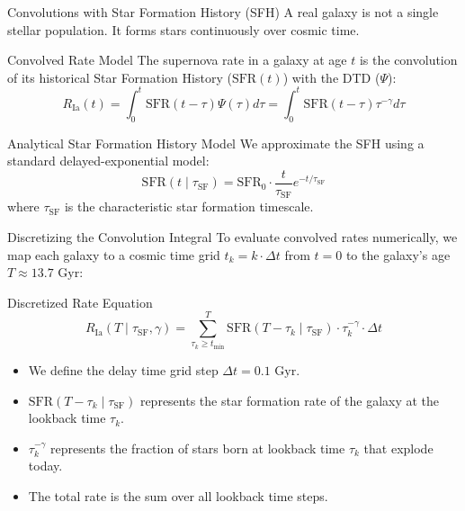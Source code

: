 \documentclass[9pt]{beamer}
\begin{document}
\begin{frame}{Convolutions with Star Formation History (SFH)}
  A real galaxy is not a single stellar population. It forms stars continuously over cosmic time.
  \begin{block}{Convolved Rate Model}
    The supernova rate in a galaxy at age $t$ is the convolution of its historical Star Formation History ($\text{SFR}(t)$) with the DTD ($\Psi$):
    $$R_{\text{Ia}}(t) = \int_0^t \text{SFR}(t - \tau) \Psi(\tau) d\tau = \int_0^t \text{SFR}(t - \tau) \tau^{-\gamma} d\tau$$
  \end{block}
  \begin{block}{Analytical Star Formation History Model}
    We approximate the SFH using a standard delayed-exponential model:
    $$\text{SFR}(t \mid \tau_{\text{SF}}) = \text{SFR}_0 \cdot \frac{t}{\tau_{\text{SF}}} e^{-t/\tau_{\text{SF}}}$$
    where $\tau_{\text{SF}}$ is the characteristic star formation timescale.
  \end{block}
\end{frame}

\begin{frame}{Discretizing the Convolution Integral}
  To evaluate convolved rates numerically, we map each galaxy to a cosmic time grid $t_k = k \cdot \Delta t$ from $t=0$ to the galaxy's age $T \approx 13.7\text{ Gyr}$:
  \begin{block}{Discretized Rate Equation}
    $$R_{\text{Ia}}(T \mid \tau_{\text{SF}}, \gamma) = \sum_{\tau_k \ge t_{\text{min}}}^{T} \text{SFR}(T - \tau_k \mid \tau_{\text{SF}}) \cdot \tau_k^{-\gamma} \cdot \Delta t$$
  \end{block}
  \begin{itemize}
    \item We define the delay time grid step $\Delta t = 0.1\text{ Gyr}$.
    \item $\text{SFR}(T - \tau_k \mid \tau_{\text{SF}})$ represents the star formation rate of the galaxy at the lookback time $\tau_k$.
    \item $\tau_k^{-\gamma}$ represents the fraction of stars born at lookback time $\tau_k$ that explode today.
    \item The total rate is the sum over all lookback time steps.
  \end{itemize}
\end{frame}
\end{document}
